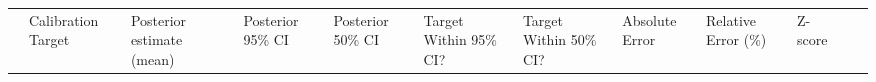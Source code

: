 \documentclass[
]{article}
\begin{document}
\begin{longtable}[]{@{}
  >{\raggedright\arraybackslash}p{}
  >{\raggedleft\arraybackslash}p{}
  >{\raggedleft\arraybackslash}p{}
  >{\raggedright\arraybackslash}p{}
  >{\raggedright\arraybackslash}p{}
  >{\raggedright\arraybackslash}p{}
  >{\raggedright\arraybackslash}p{}
  >{\raggedleft\arraybackslash}p{}
  >{\raggedleft\arraybackslash}p{}
  >{\raggedleft\arraybackslash}p{}
  >{\raggedleft\arraybackslash}p{}
  >{\raggedleft\arraybackslash}p{}@{}}
\toprule\noalign{}
\begin{minipage}[b]{\linewidth}\raggedright
\end{minipage} & \begin{minipage}[b]{\linewidth}\raggedleft
Calibration Target
\end{minipage} & \begin{minipage}[b]{\linewidth}\raggedleft
Posterior estimate (mean)
\end{minipage} & \begin{minipage}[b]{\linewidth}\raggedright
Posterior 95\% CI
\end{minipage} & \begin{minipage}[b]{\linewidth}\raggedright
Posterior 50\% CI
\end{minipage} & \begin{minipage}[b]{\linewidth}\raggedright
Target Within 95\% CI?
\end{minipage} & \begin{minipage}[b]{\linewidth}\raggedright
Target Within 50\% CI?
\end{minipage} & \begin{minipage}[b]{\linewidth}\raggedleft
Absolute Error
\end{minipage} & \begin{minipage}[b]{\linewidth}\raggedleft
Relative Error (\%)
\end{minipage} & \begin{minipage}[b]{\linewidth}\raggedleft
Z-score
\end{minipage} & \begin{minipage}[b]{\linewidth}\raggedleft

\end{minipage}
\end{longtable}
\end{document}
